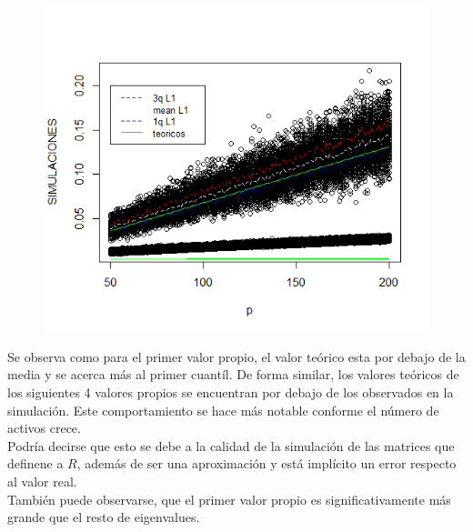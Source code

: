\documentclass[paper=letter, fontsize=14pt]{scrartcl}
\numberwithin{equation}{section} %
\numberwithin{figure}{section} %
\numberwithin{table}{section} %
\begin{document}
\begin{figure}
\includegraphics[scale=1]{Rplot.png} 
\label{f1}
\end{figure}

Se observa como para el primer valor propio, el valor teórico esta por debajo de la media y se acerca más al primer cuantíl. De forma similar, los valores teóricos de los siguientes 4 valores propios se encuentran por debajo de los observados en la simulación. Este comportamiento se hace más notable conforme el número de activos crece.\\

Podría decirse que esto se debe a la calidad de la simulación de las matrices que definene a $R$, además de ser una aproximación y está implícito un error respecto al valor real.\\

También puede observarse, que el primer valor propio es significativamente más grande que el resto de eigenvalues.
\end{document}
